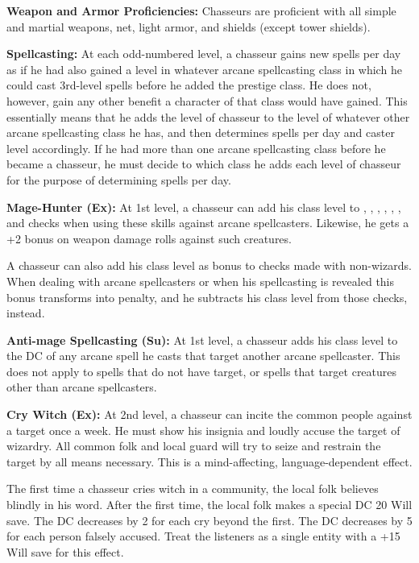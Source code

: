 {
\textbf{Weapon and Armor Proficiencies:} Chasseurs are proficient with all simple and martial weapons, net, light armor, and shields (except tower shields).

\textbf{Spellcasting:} At each odd-numbered level, a chasseur gains new spells per day as if he had also gained a level in whatever arcane spellcasting class in which he could cast 3rd-level spells before he added the prestige class. He does not, however, gain any other benefit a character of that class would have gained. This essentially means that he adds the level of chasseur to the level of whatever other arcane spellcasting class he has, and then determines spells per day and caster level accordingly. If he had more than one arcane spellcasting class before he became a chasseur, he must decide to which class he adds each level of chasseur for the purpose of determining spells per day.

\textbf{Mage-Hunter (Ex):} At 1st level, a chasseur can add his class level to , , , , , , and  checks when using these skills against arcane spellcasters. Likewise, he gets a +2 bonus on weapon damage rolls against such creatures.

A chasseur can also add his class level as bonus to  checks made with non-wizards. When dealing with arcane spellcasters or when his spellcasting is revealed this bonus transforms into penalty, and he subtracts his class level from those checks, instead.

\textbf{Anti-mage Spellcasting (Su):} At 1st level, a chasseur adds his class level to the DC of any arcane spell he casts that target another arcane spellcaster. This does not apply to spells that do not have target, or spells that target creatures other than arcane spellcasters.

\textbf{Cry Witch (Ex):} At 2nd level, a chasseur can incite the common people against a target once a week. He must show his insignia and loudly accuse the target of wizardry. All common folk and local guard will try to seize and restrain the target by all means necessary. This is a mind-affecting, language-dependent effect.

The first time a chasseur cries witch in a community, the local folk believes blindly in his word. After the first time, the local folk makes a special DC 20 Will save. The DC decreases by 2 for each cry beyond the first. The DC decreases by 5 for each person falsely accused. Treat the listeners as a single entity with a +15 Will save for this effect.

}
